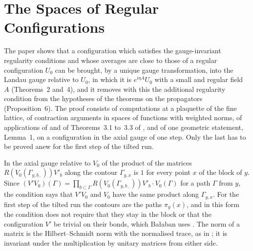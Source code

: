 \documentclass[11pt]{preprint}
\numberwithin{equation}{section}
\theoremstyle{definition}
\theoremstyle{remark}
\theoremstyle{plain}
\begin{document}
\section{The Spaces of Regular Configurations}\label{sec:regularity}

The paper \cite{BalabanREG} shows that a configuration which satisfies the gauge-invariant regularity conditions \cite[(1.7)--(1.9)]{BalabanREG} and whose averages are close to those of a regular configuration $U_0$ can be brought, by a unique gauge transformation, into the Landau gauge relative to $U_0$, in which it is $e^{i\eta A}U_0$ with a small and regular field $A$ (Theorems~2 and~4), and it removes with this the additional regularity condition \cite[(3.35)]{BalabanPBG} from the hypotheses of the theorems on the propagators (Proposition~6). The proof consists of computations at a plaquette of the fine lattice, of contraction arguments in spaces of functions with weighted norms, of applications of \cite{BalabanAVG} and of Theorems~3.1 to~3.3 of \cite{BalabanPBG}, and of one geometric statement, Lemma~1, on a configuration in the axial gauge of one step. Only the last has to be proved anew for the first step of the tilted run.

In the axial gauge relative to $V_0$ of \cite[(1.19), (1.24)]{BalabanREG} the product of the matrices $R(V_0(\Gamma_{y,b_-}))V'_b$ along the contour $\Gamma_{y,x}$ is $1$ for every point $x$ of the block of $y$. Since $(V'V_0)(\Gamma) = \prod_{b \subset \Gamma}R(V_0(\Gamma_{y,b_-}))V'_b \cdot V_0(\Gamma)$ for a path $\Gamma$ from $y$, the condition says that $V'V_0$ and $V_0$ have the same product along $\Gamma_{y,x}$. For the first step of the tilted run the contours are the paths $\pi_y(x)$, and in this form the condition does not require that they stay in the block or that the configuration $V'$ be trivial on their bonds, which Ba{\l}aban uses \cite[p.~79]{BalabanREG}. The norm of a matrix is the Hilbert--Schmidt norm with the normalised trace, as in \cite{BalabanPBG}; it is invariant under the multiplication by unitary matrices from either side.
\end{document}
